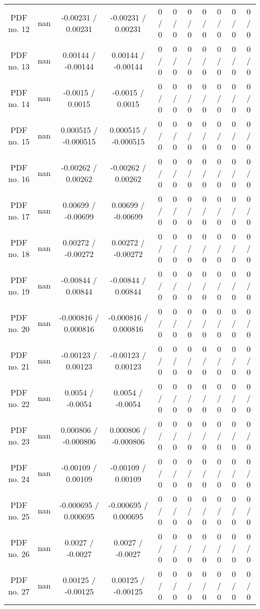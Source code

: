 \begin{table}[htbp]
\begin{center}
\begin{tabular}{|c|c|c|c|c|c|c|c|c|c|c|}
  PDF no. 12 &    nan    & -0.00231 / 0.00231 & -0.00231 / 0.00231 & 0 / 0 & 0 / 0 & 0 / 0 & 0 / 0 & 0 / 0 & 0 / 0 & 0 / 0 \\ 
  PDF no. 13 &    nan    & 0.00144 / -0.00144 & 0.00144 / -0.00144 & 0 / 0 & 0 / 0 & 0 / 0 & 0 / 0 & 0 / 0 & 0 / 0 & 0 / 0 \\ 
  PDF no. 14 &    nan    & -0.0015 / 0.0015 & -0.0015 / 0.0015 & 0 / 0 & 0 / 0 & 0 / 0 & 0 / 0 & 0 / 0 & 0 / 0 & 0 / 0 \\ 
  PDF no. 15 &    nan    & 0.000515 / -0.000515 & 0.000515 / -0.000515 & 0 / 0 & 0 / 0 & 0 / 0 & 0 / 0 & 0 / 0 & 0 / 0 & 0 / 0 \\ 
  PDF no. 16 &    nan    & -0.00262 / 0.00262 & -0.00262 / 0.00262 & 0 / 0 & 0 / 0 & 0 / 0 & 0 / 0 & 0 / 0 & 0 / 0 & 0 / 0 \\ 
  PDF no. 17 &    nan    & 0.00699 / -0.00699 & 0.00699 / -0.00699 & 0 / 0 & 0 / 0 & 0 / 0 & 0 / 0 & 0 / 0 & 0 / 0 & 0 / 0 \\ 
  PDF no. 18 &    nan    & 0.00272 / -0.00272 & 0.00272 / -0.00272 & 0 / 0 & 0 / 0 & 0 / 0 & 0 / 0 & 0 / 0 & 0 / 0 & 0 / 0 \\ 
  PDF no. 19 &    nan    & -0.00844 / 0.00844 & -0.00844 / 0.00844 & 0 / 0 & 0 / 0 & 0 / 0 & 0 / 0 & 0 / 0 & 0 / 0 & 0 / 0 \\ 
  PDF no. 20 &    nan    & -0.000816 / 0.000816 & -0.000816 / 0.000816 & 0 / 0 & 0 / 0 & 0 / 0 & 0 / 0 & 0 / 0 & 0 / 0 & 0 / 0 \\ 
  PDF no. 21 &    nan    & -0.00123 / 0.00123 & -0.00123 / 0.00123 & 0 / 0 & 0 / 0 & 0 / 0 & 0 / 0 & 0 / 0 & 0 / 0 & 0 / 0 \\ 
  PDF no. 22 &    nan    & 0.0054 / -0.0054 & 0.0054 / -0.0054 & 0 / 0 & 0 / 0 & 0 / 0 & 0 / 0 & 0 / 0 & 0 / 0 & 0 / 0 \\ 
  PDF no. 23 &    nan    & 0.000806 / -0.000806 & 0.000806 / -0.000806 & 0 / 0 & 0 / 0 & 0 / 0 & 0 / 0 & 0 / 0 & 0 / 0 & 0 / 0 \\ 
  PDF no. 24 &    nan    & -0.00109 / 0.00109 & -0.00109 / 0.00109 & 0 / 0 & 0 / 0 & 0 / 0 & 0 / 0 & 0 / 0 & 0 / 0 & 0 / 0 \\ 
  PDF no. 25 &    nan    & -0.000695 / 0.000695 & -0.000695 / 0.000695 & 0 / 0 & 0 / 0 & 0 / 0 & 0 / 0 & 0 / 0 & 0 / 0 & 0 / 0 \\ 
  PDF no. 26 &    nan    & 0.0027 / -0.0027 & 0.0027 / -0.0027 & 0 / 0 & 0 / 0 & 0 / 0 & 0 / 0 & 0 / 0 & 0 / 0 & 0 / 0 \\ 
  PDF no. 27 &    nan    & 0.00125 / -0.00125 & 0.00125 / -0.00125 & 0 / 0 & 0 / 0 & 0 / 0 & 0 / 0 & 0 / 0 & 0 / 0 & 0 / 0 \\ 

\end{tabular}
\end{center}
\end{table}
